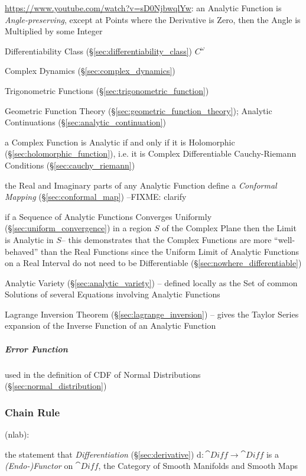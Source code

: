 \url{https://www.youtube.com/watch?v=sD0NjbwqlYw}: an Analytic Function is
\emph{Angle-preserving}, except at Points where the Derivative is Zero, then the
Angle is Multiplied by some Integer

Differentiability Class (\S\ref{sec:differentiability_class}) $C^{\omega}$

Complex Dynamics (\S\ref{sec:complex_dynamics})

Trigonometric Functions (\S\ref{sec:trigonometric_function})

\fist Geometric Function Theory (\S\ref{sec:geometric_function_theory});
Analytic Continuations (\S\ref{sec:analytic_continuation})

a Complex Function is Analytic if and only if it is Holomorphic
(\S\ref{sec:holomorphic_function}), i.e. it is Complex Differentiable \fist
Cauchy-Riemann Conditions (\S\ref{sec:cauchy_riemann})

the Real and Imaginary parts of any Analytic Function define a \emph{Conformal
  Mapping} (\S\ref{sec:conformal_map}) --FIXME: clarify

if a Sequence of Analytic Functions Converges Uniformly
(\S\ref{sec:uniform_convergence}) in a region $S$ of the Complex Plane then the
Limit is Analytic in $S$-- this demonstrates that the Complex Functions are
more ``well-behaved'' than the Real Functions since the Uniform Limit of
Analytic Functions on a Real Interval do not need to be Differentiable
(\S\ref{sec:nowhere_differentiable})

Analytic Variety (\S\ref{sec:analytic_variety}) -- defined locally as the Set of
common Solutions of several Equations involving Analytic Functions

Lagrange Inversion Theorem (\S\ref{sec:lagrange_inversion}) -- gives the Taylor
Series expansion of the Inverse Function of an Analytic Function



\subparagraph{Error Function}\label{sec:error_function}\hfill

used in the definition of CDF of Normal Distributions
(\S\ref{sec:normal_distribution})



\subsubsection{Chain Rule}\label{sec:chain_rule}

(nlab):

the statement that \emph{Differentiation} (\S\ref{sec:derivative}) $\mathrm{d} :
\cat{Diff} \rightarrow \cat{Diff}$ is a \emph{(Endo-)Functor} on $\cat{Diff}$,
the Category of Smooth Manifolds and Smooth Maps

